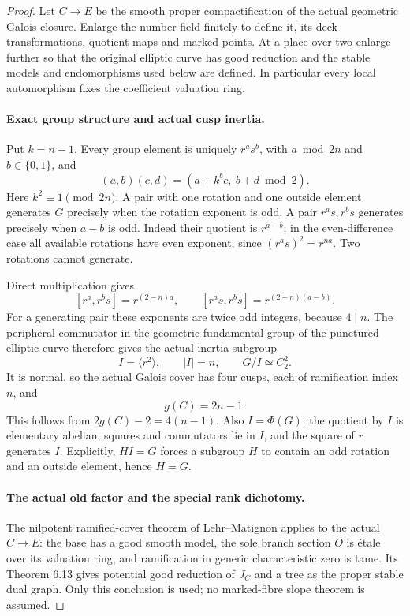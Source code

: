 \begin{proof}
Let \(C\to E\) be the smooth proper compactification of
the actual geometric Galois closure. Enlarge the number field
finitely to define it, its deck transformations, quotient maps
and marked points. At a place over two enlarge further so that
the original elliptic curve has good reduction and the stable
models and endomorphisms used below are defined. In particular
every local automorphism fixes the coefficient valuation ring.

\paragraph{Exact group structure and actual cusp inertia.}
Put \(k=n-1\). Every group element is uniquely \(r^a s^b\),
with \(a\bmod2n\) and \(b\in\{0,1\}\), and
\[
                (a,b)(c,d)=(a+k^b c,\ b+d\bmod2).
                                                        \tag{A.73.2}
\]
Here \(k^2\equiv1\pmod{2n}\). A pair with one rotation
and one outside element generates \(G\) precisely when
the rotation exponent is odd. A pair \(r^a s,r^b s\)
generates precisely when \(a-b\) is odd. Indeed their
quotient is \(r^{a-b}\); in the even-difference case
all available rotations have even exponent, since
\((r^a s)^2=r^{na}\). Two rotations cannot generate.

Direct multiplication gives
\[
 [r^a,r^b s]=r^{(2-n)a},\qquad
 [r^a s,r^b s]=r^{(2-n)(a-b)}.                    \tag{A.73.3}
\]
For a generating pair these exponents are twice odd integers,
because \(4\mid n\). The peripheral commutator in the
geometric fundamental group of the punctured elliptic curve
therefore gives the actual inertia subgroup
\[
             I=\langle r^2\rangle,
             \qquad |I|=n,\qquad G/I\simeq C_2^2.
                                                        \tag{A.73.4}
\]
It is normal, so the actual Galois cover has four cusps,
each of ramification index \(n\), and
\[
                       g(C)=2n-1.                 \tag{A.73.5}
\]
This follows from \(2g(C)-2=4(n-1)\). Also \(I=\Phi(G)\):
the quotient by \(I\) is elementary abelian, squares and
commutators lie in \(I\), and the square of \(r\) generates
\(I\). Explicitly, \(HI=G\) forces a subgroup \(H\) to
contain an odd rotation and an outside element, hence \(H=G\).

\paragraph{The actual old factor and the special rank dichotomy.}
The nilpotent ramified-cover theorem of Lehr--Matignon applies
to the actual \(C\to E\): the base has a good smooth model,
the sole branch section \(O\) is \'{e}tale over its valuation
ring, and ramification in generic characteristic zero is tame.
Its Theorem 6.13 gives potential good reduction of \(J_C\)
and a tree as the proper stable dual graph.
\cite{fghLehrMatignon2005,fghSaidi2007}
Only this conclusion is used; no marked-fibre slope theorem
is assumed.


\end{proof}

